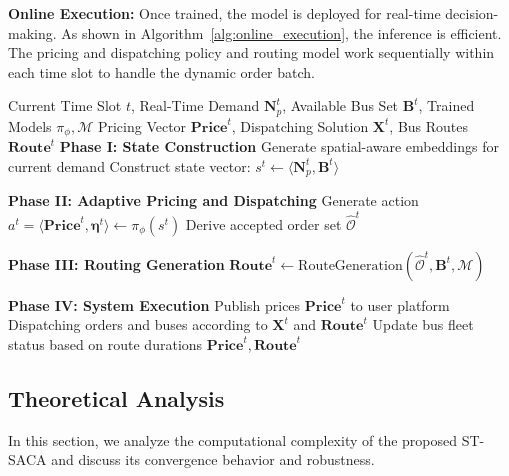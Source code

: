 \documentclass[lettersize,journal]{IEEEtran}
\begin{document}
\textbf{Online Execution:} Once trained, the model is deployed for real-time decision-making. As shown in Algorithm~\ref{alg:online_execution}, the inference is efficient. The pricing and dispatching policy and routing model work sequentially within each time slot to handle the dynamic order batch.

\begin{algorithm}[tb]
\caption{Online Execution Procedure (Per Time Slot)}
\label{alg:online_execution}
\begin{algorithmic}[1]
\REQUIRE Current Time Slot $t$, Real-Time Demand $\mathbf{N}_p^t$, Available Bus Set $\mathbf{B}^t$, Trained Models $\pi_\phi, \mathcal{M}$
\ENSURE Pricing Vector $\mathbf{Price}^t$, Dispatching Solution $\mathbf{X}^t$, Bus Routes $\mathbf{Route}^t$
\STATE \textbf{Phase I: State Construction}
\STATE Generate spatial-aware embeddings for current demand
\STATE Construct state vector: $s^t \leftarrow \langle \mathbf{N}_p^t, \mathbf{B}^t \rangle$

\STATE \textbf{Phase II: Adaptive Pricing and Dispatching}
\STATE Generate action $a^t = \langle \mathbf{Price}^t, \boldsymbol{\eta}^t \rangle \leftarrow \pi_\phi(s^t)$ 
\STATE Derive accepted order set $\hat{\mathcal{O}}^t$

\STATE \textbf{Phase III: Routing Generation}
\STATE $\mathbf{Route}^t \leftarrow \text{RouteGeneration}(\hat{\mathcal{O}}^t, \mathbf{B}^t, \mathcal{M})$

\STATE \textbf{Phase IV: System Execution}
\STATE Publish prices $\mathbf{Price}^t$ to user platform
\STATE Dispatching orders and buses according to $\mathbf{X}^t$ and $\mathbf{Route}^t$
\STATE Update bus fleet status based on route durations
\RETURN $\mathbf{Price}^t, \mathbf{Route}^t$
\end{algorithmic}
\end{algorithm}

\subsection{Theoretical Analysis}
\label{sec:theory}

In this section, we analyze the computational complexity of the proposed ST-SACA and discuss its convergence behavior and robustness.
\end{document}
